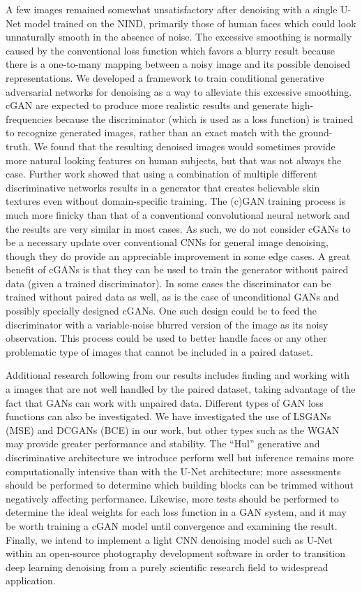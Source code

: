 A few images remained somewhat unsatisfactory after denoising with a single U-Net model trained on the \ac{NIND}, primarily those of human faces which could look unnaturally smooth in the absence of noise. The excessive smoothing is normally caused by the conventional loss function which favors a blurry result because there is a one-to-many mapping between a noisy image and its possible denoised representations. We developed a framework to train conditional generative adversarial networks for denoising as a way to alleviate this excessive smoothing. \ac{cGAN} are expected to produce more realistic results and generate high-frequencies because the discriminator (which is used as a loss function) is trained to recognize generated images, rather than an exact match with the ground-truth. We found that the resulting denoised images would sometimes provide more natural looking features on human subjects, but that was not always the case. Further work showed that using a combination of multiple different discriminative networks results in a generator that creates believable skin textures even without domain-specific training. The (c)\ac{GAN} training process is much more finicky than that of a conventional convolutional neural network and the results are very similar in most cases. As such, we do not consider \acp{cGAN} to be a necessary update over conventional \acp{CNN} for general image denoising, though they do provide an appreciable improvement in some edge cases. A great benefit of \acp{cGAN} is that they can be used to train the generator without paired data (given a trained discriminator). In some cases the discriminator can be trained without paired data as well, as is the case of unconditional \acp{GAN} and possibly specially designed \acp{cGAN}. One such design could be to feed the discriminator with a variable-noise blurred version of the image as its noisy observation. This process could be used to better handle faces or any other problematic type of images that cannot be included in a paired dataset.

Additional research following from our results includes finding and working with a images that are not well handled by the paired dataset, taking advantage of the fact that \acp{GAN} can work with unpaired data. Different types of \ac{GAN} loss functions can also be investigated. We have investigated the use of \acp{LSGAN} (\ac{MSE}) and \acp{DCGAN} (\ac{BCE}) in our work, but other types such as the \ac{WGAN} may provide greater performance and stability. The ``Hul'' generative and discriminative architecture we introduce perform well but inference remains more computationally intensive than with the U-Net architecture; more assessments should be performed to determine which building blocks can be trimmed without negatively affecting performance. Likewise, more tests should be performed to determine the ideal weights for each loss function in a \ac{GAN} system, and it may be worth training a \ac{cGAN} model until convergence and examining the result. Finally, we intend to implement a light \ac{CNN} denoising model such as U-Net within an open-source photography development software in order to transition deep learning denoising from a purely scientific research field to widespread application.

